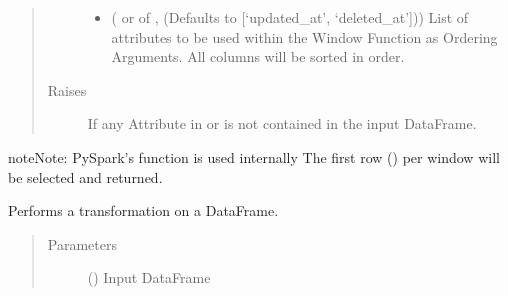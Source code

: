 \documentclass[a4paper,10pt, twoside,english]{sphinxmanual}
\begin{document}
\begin{fulllineitems}
\begin{quote}
\begin{description}
\begin{itemize}
\item {} 
 ( or  of , (Defaults to {[}‘updated\_at’, ‘deleted\_at’{]})) \textendash{} List of attributes to be used within the Window Function as Ordering Arguments.
All columns will be sorted in  order.

\end{itemize}

\item[{Raises}] \leavevmode
{} \textendash{} If any Attribute in  or  is not contained in the
input DataFrame.

\end{description}\end{quote}

\begin{sphinxadmonition}{note}{Note:}
PySpark’s  function is used internally
The first row () per window will be selected and returned.
\end{sphinxadmonition}

\begin{fulllineitems}
\label{\detokenize{transformer/newest_by_group:spooq2.transformer.newest_by_group.NewestByGroup.transform}}
Performs a transformation on a DataFrame.
\begin{quote}\begin{description}
\item[{Parameters}] \leavevmode
{} () \textendash{} Input DataFrame


\end{description}
\end{quote}
\end{fulllineitems}
\end{fulllineitems}
\end{document}
